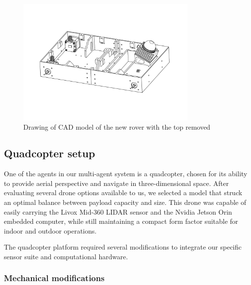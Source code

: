 \documentclass[12pt]{article}
\begin{document}
        \begin{figure}[H]
            \centering
            \includegraphics[width=0.8\textwidth]{Images/roverv2.pdf}
            \caption{Drawing of CAD model of the new rover with the top removed}
            \label{fig:crawlerv2_cad}
        \end{figure}


    \subsection{Quadcopter setup}
            

            One of the agents in our multi-agent system is a quadcopter, chosen for its ability to provide aerial perspective and navigate in three-dimensional space. After evaluating several drone options available to us, we selected a model that struck an optimal balance between payload capacity and size. This drone was capable of easily carrying the Livox Mid-360 LIDAR sensor and the Nvidia Jetson Orin embedded computer, while still maintaining a compact form factor suitable for indoor and outdoor operations.

            The quadcopter platform required several modifications to integrate our specific sensor suite and computational hardware.

            \subsubsection{Mechanical modifications}
\end{document}
